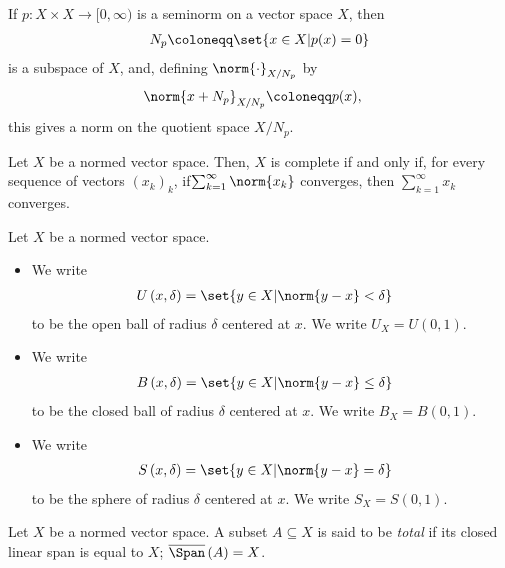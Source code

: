 \begin{theorem}\label{thm:quotient_space_norm}
  If $p\colon X\times X \rightarrow [0,\infty)$ is a seminorm on a vector space $X$, then 
  \begin{align*}
    N_p\coloneq \set{x\in X | p(x) = 0}
  \end{align*}
  is a subspace of $X$, and, defining $\norm{\cdot}_{X/N_p}$ by
  \begin{align*}
    \norm{x + N_p}_{X/N_p} &\coloneq p(x),
  \end{align*}
  this gives a norm on the quotient space $X/N_p$.
\end{theorem}
\begin{theorem}
  Let $X$ be a normed vector space. Then, $X$ is complete if and only if, for every sequence of vectors $\left(x_k\right)_k$, if$\sum_{k=1}^{\infty}\norm{x_k}$ converges, then $\sum_{k=1}^{\infty}x_k$ converges.
\end{theorem}
\begin{definition}\label{def:open_closed_balls}
  Let $X$ be a normed vector space.
  \begin{itemize}
    \item We write 
      \begin{align*}
        U\left(x,\delta\right) &= \set{y\in X | \norm{y-x} < \delta}
      \end{align*}
      to be the open ball of radius $\delta$ centered at $x$. We write $U_X = U\left(0,1\right)$.
    \item We write
      \begin{align*}
        B\left(x,\delta\right) &= \set{y\in X | \norm{y-x} \leq \delta}
      \end{align*}
      to be the closed ball of radius $\delta$ centered at $x$. We write $B_X = B\left(0,1\right)$.
    \item We write
      \begin{align*}
        S\left(x,\delta\right) &= \set{y\in X | \norm{y-x} = \delta}
      \end{align*}
      to be the sphere of radius $\delta$ centered at $x$. We write $S_X = S\left(0,1\right)$.
  \end{itemize}
\end{definition}
\begin{definition}\label{def:total_subset}
  Let $X$ be a normed vector space. A subset $A\subseteq X$ is said to be \textit{total} if its closed linear span is equal to $X$; $\overline{\Span}\left(A\right) = X$.
\end{definition}

